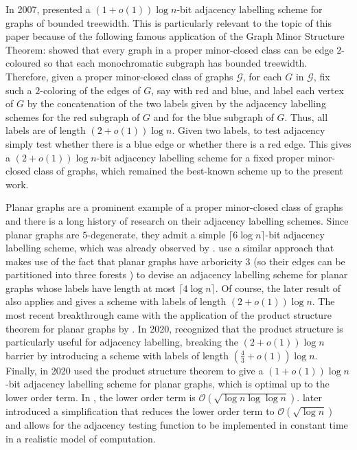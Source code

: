 \documentclass{patmorin}
\newcommand{\vida}[1]{\noindent{\color{pink} VD: #1}}
\newcommand{\Oh}{\calO}
\newcommand{\calG}{\mathcal{G}}
\newcommand{\calO}{\mathcal{O}}
\begin{document}

In 2007, \citet{gavoille.labourel:shorter} presented
a $(1+o(1))\log n$-bit adjacency labelling scheme for graphs of bounded treewidth.
This is particularly relevant to the topic of this paper because of the following famous application of the Graph Minor Structure Theorem:
\citet{devos2004} showed that every graph
in a proper minor-closed class can be edge $2$-coloured so that each monochromatic subgraph
has bounded treewidth.
Therefore, given a proper minor-closed class of graphs $\calG$,
for each $G$ in $\calG$, fix such a $2$-coloring of the edges of $G$, say with red and blue, and label each vertex of $G$ by the concatenation of the two labels given by the adjacency labelling schemes for the red subgraph of $G$ and for the blue subgraph of $G$. Thus, all labels are of length $(2+o(1))\log n$.
Given two labels, to test adjacency simply test whether there is a blue edge or whether there is a red edge.
This gives a $(2+o(1))\log n$-bit adjacency labelling scheme for a fixed proper minor-closed class of graphs, which remained the best-known scheme up to the present work.

Planar graphs are a prominent example of a proper minor-closed class of graphs and there is a long history of research
on their adjacency labelling schemes.
Since planar graphs are $5$-degenerate,
they admit a simple $\lceil6\log n\rceil$-bit adjacency labelling scheme, which was already observed by \citet{muller:local}.
\citet{kannan.naor.ea:implicit} use a similar approach that makes use of the fact that planar graphs have arboricity 3 (so their edges can be partitioned into three forests \cite{nash-williams:edge-disjoint}) to devise an adjacency labelling scheme for planar graphs whose labels have length at most $\lceil4\log n\rceil$.
Of course, the later result of \citet{gavoille.labourel:shorter} also applies and gives a scheme with labels of length $(2+o(1))\log n$.
The most recent breakthrough came with the application of the product structure theorem for planar graphs by \citet{dujmovic.joret.ea:planar}.
In 2020, \citet{BGP22} recognized that the product structure is particularly useful for adjacency labelling, breaking the $(2+o(1))\log n$  barrier by introducing a scheme with labels of length $(\frac{4}{3}+o(1))\log n$.
Finally, in 2020 \citet{dujmovic.esperet.ea:adjacency} used the product structure theorem to give a $(1+o(1))\log n$-bit adjacency labelling scheme for planar graphs, which is optimal up to the lower order term. In \cite{dujmovic.esperet.ea:adjacency}, the lower order term is $\Oh(\sqrt{\log n\log\log n})$.  \citet{gawrychowski.janczewski:simpler} later introduced a simplification that reduces the lower order term to $\Oh(\sqrt{\log n})$ and allows for the adjacency testing function to be implemented in constant time in a realistic model of computation.
\end{document}
